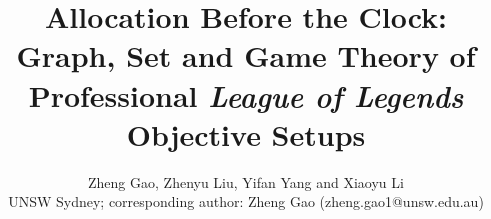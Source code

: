 \documentclass[journal]{IEEEtran}
\begin{document}
\title{Allocation Before the Clock: Graph, Set and Game Theory of Professional \emph{League of Legends} Objective Setups}

\author{Zheng Gao, Zhenyu Liu, Yifan Yang and Xiaoyu Li\\ UNSW Sydney; corresponding author: Zheng Gao (zheng.gao1@unsw.edu.au)}


\maketitle











\clearpage



\clearpage
\appendices

\end{document}

